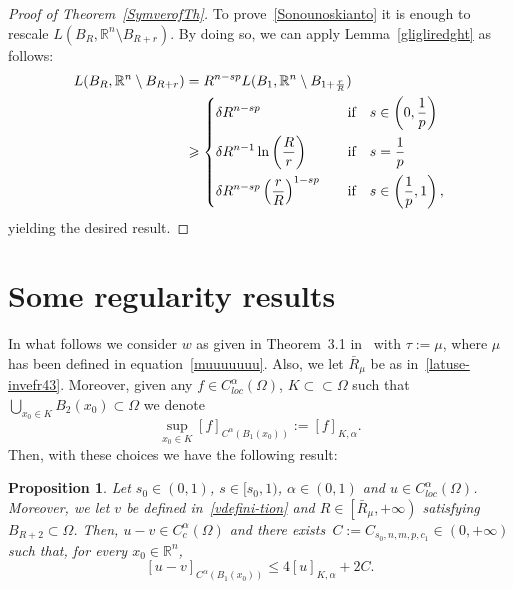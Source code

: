 \documentclass[12pt]{article}
\newcommand{\R}{\mathbb{R}}
\numberwithin{equation}{section}
\newtheorem{prop}[thm]{Proposition}
\renewcommand{\leq}{\leqslant}
\renewcommand{\geq}{\geqslant}
\begin{document}
\begin{appendix}
\begin{proof}[Proof of Theorem~\ref{SymverofTh}]
To prove~\eqref{Sonounoskianto} it is enough to rescale $L(B_R,\R^n\setminus B_{R+r})$. By doing so, we can apply Lemma~\ref{gligliredght} as follows:
\begin{equation*}
\begin{split}
L(B_R,\R^n \setminus B_{R+r})&=R^{n-sp} L(B_1,\R^n\setminus B_{1+\frac{r}{R}})\\
&\geq \begin{dcases}
\delta R^{n-sp}\quad &\mbox{if}\quad s\in\left(0,\frac{1}{p}\right)\\
\delta R^{n-1}  \ln \left(\frac{R}{r}\right)\quad &\mbox{if}\quad s=\frac{1}{p}\\
\delta R^{n-sp} \left(\frac{r}{R}\right)^{1-sp}\quad &\mbox{if}\quad s\in\left(\frac{1}{p},1\right),
\end{dcases}
\end{split}
\end{equation*}yielding the desired result.
\end{proof}

\section{Some regularity results}

In what follows we consider $w$ as given in Theorem~3.1 in~\cite{DFVERPP} with $\tau:=\mu$, where $\mu$ has been defined in equation~\eqref{muuuuuuu}. Also, we let $\bar{R}_\mu$ be as in~\eqref{latuse-invefr43}. Moreover, given any $f\in C_{\textit{loc}}^\alpha(\Omega)$, $K\subset\subset\Omega$ such that $\bigcup_{x_0\in K}B_2(x_0)\subset\Omega$ we denote 
\begin{equation*}
\sup_{x_0\in K} \left[f\right]_{C^\alpha(B_1(x_0))}:=\left[f\right]_{K,\alpha}. 
\end{equation*} 
Then, with these choices we have the following result:   

\begin{prop}\label{hiolevcgfdb4t54}
Let $s_0\in (0,1)$, $s\in [s_0,1)$, $\alpha\in (0,1)$ and $u\in C_{\textit{loc}}^\alpha(\Omega)$. Moreover, we let $v$ be defined in~\eqref{vdefini-tion} and $R\in \left[\bar{R}_{\mu},+\infty\right)$ satisfying $B_{R+2}\subset \Omega$. Then, $u-v\in C_{c}^\alpha(\Omega)$ and there exists~$C:=C_{s_0,n,m,p,c_1}\in (0,+\infty)$ such that, for every $x_0\in \R^n$, 
\begin{equation}\label{tebegdfjuybgf}
\left[u-v\right]_{C^\alpha(B_1(x_0))}\leq  4 \left[u\right]_{K,\alpha}+2C.
\end{equation} 
\end{prop}


\end{appendix}
\end{document}

